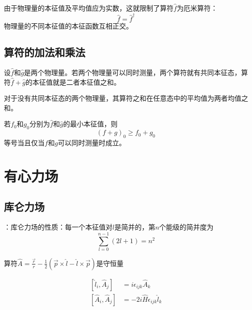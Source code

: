 \documentclass[12pt, a4paper, oneside]{ctexbook}
\newcommand{\hl}[1]{\hlbox{#1}}
\newcounter{#2}
\newcounter{#2}[#1]
\numberwithin{#2}{#1}
\newcommand{\com}[2]{\left[#1,#2\right]}
\newcommand{\akuo}[1]{\left[#1\right]}
\newcommand{\ep}[1]{\epsilon_{#1}}%
\begin{document}
            \begin{deduce}
              由于物理量的本征值及平均值应为实数，这就限制了算符\(\hat f\)为厄米算符：
              \begin{equation}
                \hat f=\hat f^\dagger
              \end{equation}
              物理量的不同本征值的本征函数互相正交。
            \end{deduce}
            \section{算符的加法和乘法}
            \begin{law}
              设\(\hat f\)和\(\hat g\)是两个物理量。若两个物理量可以同时测量，两个算符就有共同本征态，算符\(\hat f+\hat g\)的本征值就是二者本征值之和。

              对于没有共同本征态的两个物理量，其算符之和在任意态中的平均值为两者均值之和。
            \end{law}
            \begin{theorem}
              若\(f_0\)和\(g_0\)分别为\(\hat f\)和\(\hat g\)的最小本征值，则
              \begin{equation}
                (f+g)_0\geqslant f_0+g_0
              \end{equation}
              等号当且仅当\(f\)和\(g\)可以同时测量时成立。
            \end{theorem}
            




            \chapter{有心力场}
            \section{库仑力场}
            \begin{attr}
                \hl{库仑简并}：库仑力场的性质：每一个本征值对\(l\)是简并的，第\(n\)个能级的简并度为
                \begin{equation}
                    \sum_{l=0}^{n-1}(2l+1)=n^2
                \end{equation}
            \end{attr}
            \begin{theorem}
                算符\(\hat A=\frac{\vec r} r-\frac12(\vec p\times\hat l-\hat l\times \vec p)\)是守恒量
            \end{theorem}
            \begin{commute}
                \begin{align}
                    \akuo{\hat l_i,\hat A_j}&=i\epsilon_{ijk}\hat A_k\\
                    \com{\hat A_i}{\hat A_j}&=-2i\hat H\ep{ijk}\hat l_k
                \end{align}
            \end{commute} 
\end{document}
